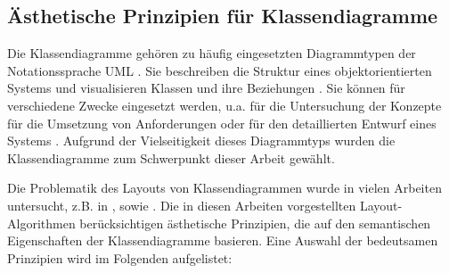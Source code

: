 \subsection{Ästhetische Prinzipien für Klassendiagramme}
\label{subsec:aesthetics-criteria-class-diagrams}

Die Klassendiagramme gehören zu häufig eingesetzten Diagrammtypen der Notationssprache UML \cite{Fowler03UML-Distilled:}. Sie beschreiben die Struktur eines objektorientierten Systems und visualisieren Klassen und ihre Beziehungen \cite{Siebenhaller03Automatisches, Ambler05The-Elements}. Sie können für verschiedene Zwecke eingesetzt werden, u.a. für die Untersuchung der Konzepte für die Umsetzung von Anforderungen oder für den detaillierten Entwurf eines Systems \cite{Ambler04UML-2-Class, Ambler05The-Elements}. Aufgrund der Vielseitigkeit dieses Diagrammtyps wurden die Klassendiagramme zum Schwerpunkt dieser Arbeit gewählt.

Die Problematik des Layouts von Klassendiagrammen wurde in vielen Arbeiten untersucht, z.B. in \cite{Siebenhaller03Automatisches}, \cite{Eichelberger05Aesthetics} sowie \cite{Eiglsperger04Automatic}. Die in diesen Arbeiten vorgestellten Layout-Algorithmen berücksichtigen ästhetische Prinzipien, die auf den semantischen Eigenschaften der Klassendiagramme basieren. Eine Auswahl der bedeutsamen Prinzipien wird im Folgenden aufgelistet:

